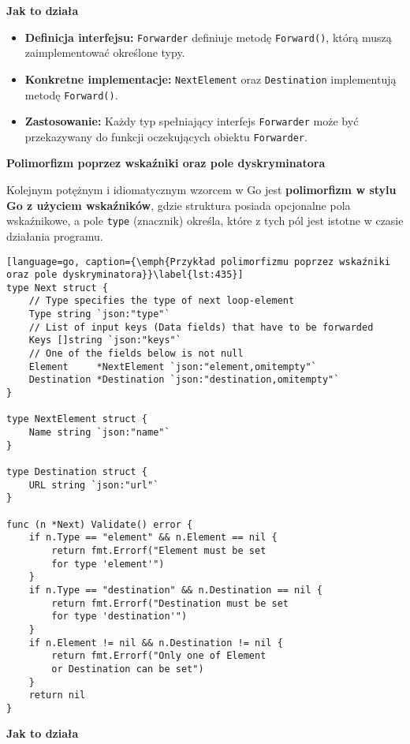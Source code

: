 \textbf{Jak to działa}

\begin{itemize}
    \item \textbf{Definicja interfejsu:}  
    \texttt{Forwarder} definiuje metodę \texttt{Forward()}, którą muszą zaimplementować określone typy.
    
    \item \textbf{Konkretne implementacje:}  
    \texttt{NextElement} oraz \texttt{Destination} implementują metodę \texttt{Forward()}.
    
    \item \textbf{Zastosowanie:}  
    Każdy typ spełniający interfejs \texttt{Forwarder} może być przekazywany do funkcji oczekujących obiektu \texttt{Forwarder}.
\end{itemize}

\textbf{Polimorfizm poprzez wskaźniki oraz pole dyskryminatora}

Kolejnym potężnym i idiomatycznym wzorcem w Go jest \textbf{polimorfizm w stylu Go z użyciem wskaźników}, gdzie struktura posiada opcjonalne pola wskaźnikowe, a pole \texttt{type} (znacznik) określa, które z tych pól jest istotne w czasie działania programu.

\begin{lstlisting}[language=go, caption={\emph{Przykład polimorfizmu poprzez wskaźniki oraz pole dyskryminatora}}\label{lst:435}]
type Next struct {
	// Type specifies the type of next loop-element
	Type string `json:"type"`
	// List of input keys (Data fields) that have to be forwarded
	Keys []string `json:"keys"`
	// One of the fields below is not null
	Element     *NextElement `json:"element,omitempty"`
	Destination *Destination `json:"destination,omitempty"`
}

type NextElement struct {
	Name string `json:"name"`
}

type Destination struct {
	URL string `json:"url"`
}

func (n *Next) Validate() error {
	if n.Type == "element" && n.Element == nil {
		return fmt.Errorf("Element must be set 
        for type 'element'")
	}
	if n.Type == "destination" && n.Destination == nil {
		return fmt.Errorf("Destination must be set 
        for type 'destination'")
	}
	if n.Element != nil && n.Destination != nil {
		return fmt.Errorf("Only one of Element 
        or Destination can be set")
	}
	return nil
}
\end{lstlisting}

\textbf{Jak to działa}

